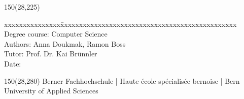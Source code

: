 \begin{titlepage}
\begin{flushleft}
\begin{textblock}{150}(28,225)
\fontsize{10pt}{17pt}\selectfont
\begin{tabbing}
xxxxxxxxxxxxxxx\=xxxxxxxxxxxxxxxxxxxxxxxxxxxxxxxxxxxxxxxxxxxxxxx \kill
Degree course:	\> Computer Science	\\		%
Authors:		\> Anna Doukmak, Ramon Boss		\\					%
Tutor:	\> Prof. Dr. Kai Brünnler		\\							%
Date:			\> \versiondate					\\							%
\end{tabbing}

\end{textblock}
\end{flushleft}

\begin{textblock}{150}(28,280)
\noindent 
\color{bfhgrey}\fontsize{9pt}{10pt}\selectfont
Berner Fachhochschule | Haute \'ecole sp\'ecialis\'ee bernoise | Bern University of Applied Sciences
\color{black}\selectfont
\end{textblock}


\end{titlepage}

%
%
